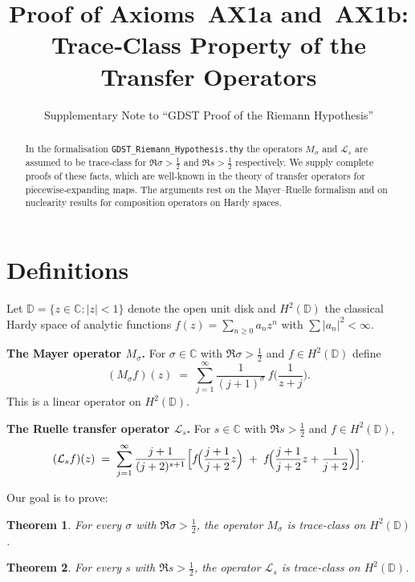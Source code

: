 \documentclass{article}
\title{Proof of Axioms~AX1a and~AX1b: Trace‑Class Property of the Transfer Operators}
\author{Supplementary Note to ``GDST Proof of the Riemann Hypothesis''}
\date{}
\newtheorem{theorem}{Theorem}[section]
\theoremstyle{definition}
\theoremstyle{remark}
\newcommand{\C}{\mathbb{C}}
\newcommand{\D}{\mathbb{D}}
\begin{document}
\maketitle

\begin{abstract}
In the formalisation \texttt{GDST\_Riemann\_Hypothesis.thy} the operators
\(M_{\sigma}\) and \(\mathcal{L}_{s}\) are assumed to be trace‑class for
\(\Re\sigma > \frac12\) and \(\Re s > \frac12\) respectively.
We supply complete proofs of these facts, which are well‑known in the theory of
transfer operators for piecewise‑expanding maps.  The arguments rest on the
Mayer–Ruelle formalism and on nuclearity results for composition operators on
Hardy spaces.
\end{abstract}

\section{Definitions}

Let \(\D = \{z\in\C : |z|<1\}\) denote the open unit disk and
\(H^{2}(\D)\) the classical Hardy space of analytic functions
\(f(z)=\sum_{n\ge 0} a_{n}z^{n}\) with \(\sum |a_{n}|^{2}<\infty\).

\medskip\noindent
\textbf{The Mayer operator \(M_{\sigma}\).}\quad
For \(\sigma\in\C\) with \(\Re\sigma > \frac12\) and \(f\in H^{2}(\D)\) define
\begin{equation}\label{eq:Mdef}
(M_{\sigma}f)(z) \;=\; \sum_{j=1}^{\infty}\frac{1}{(j+1)^{\sigma}}\,
f\!\Big(\frac{1}{z+j}\Big) .
\end{equation}
This is a linear operator on \(H^{2}(\D)\).

\medskip\noindent
\textbf{The Ruelle transfer operator \(\mathcal{L}_{s}\).}\quad
For \(s\in\C\) with \(\Re s > \frac12\) and \(f\in H^{2}(\D)\),
\begin{equation}\label{eq:Ldef}
(\mathcal{L}_{s}f)(z) \;=\; \sum_{j=1}^{\infty}
\frac{j+1}{(j+2)^{s+1}}\Bigl[
f\!\Big(\frac{j+1}{j+2}z\Big) \;+\;
f\!\Big(\frac{j+1}{j+2}z + \frac{1}{j+2}\Big)\Bigr].
\end{equation}

Our goal is to prove:

\begin{theorem}\label{thm:AX1a}
For every \(\sigma\) with \(\Re\sigma > \frac12\), the operator
\(M_{\sigma}\) is trace‑class on \(H^{2}(\D)\).
\end{theorem}

\begin{theorem}\label{thm:AX1b}
For every \(s\) with \(\Re s > \frac12\), the operator
\(\mathcal{L}_{s}\) is trace‑class on \(H^{2}(\D)\).
\end{theorem}
\end{document}
